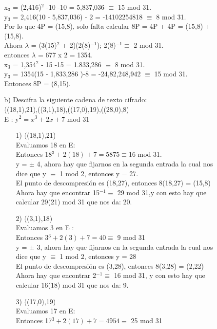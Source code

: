 \documentclass[11pt,letterpaper]{article}
\begin{document}
\begin{enumerate}
\begin{itemize}
x$_{3}$ = (2,416)$^{2}$ -10 -10 = 5,837,036 $\equiv$ 15 mod 31.\\
y$_{3}$ = 2,416(10 - 5,837,036) - 2 = -14102254818 $\equiv$ 8 mod 31.\\
Por lo que 4P = (15,8), solo falta calcular 8P = 4P + 4P = (15,8) + (15,8).\\
Ahora $\lambda$ = (3(15)$^{2}$ + 2)(2(8)$^{-1}$); 2(8)$^{-1} \equiv $ 2 mod 31. \\
entonces $\lambda$ = 677 x 2 = 1354.\\
x$_{3}$ = 1,354$^{2}$ - 15 -15 = 1.833,286 $\equiv$ 8 mod 31.\\
y$_{3}$ = 1354(15 - 1,833,286 )-8 = -24,82,248,942 $\equiv$ 15 mod 31.\\
Entonces 8P = (8,15).
\item[b)] Descifra la siguiente cadena de texto cifrado: \\
((18,1),21),((3,1),18),((17,0),19),((28,0),8)\\
E : y$^{2} = x^{3} + 2x + 7$ mod 31
\begin{itemize}
\item[1)] ((18,1),21)\\
Evaluamos 18 en E:\\
Entonces 18$^{3} +2(18) + 7 = 5875 \equiv $16 mod 31.\\
y = $\pm$ 4, ahora hay que fijarnos en la segunda entrada la cual nos dice que y $\equiv$ 1 mod 2, entonces y = 27.\\
El punto de descompresión es (18,27), entonces 8(18,27) = (15,8)\\
Ahora hay que encontrar 15$^{-1} \equiv $ 29 mod 31,y con esto hay que calcular 29(21) mod 31 que nos da: 20.
\item[2)] ((3,1),18)\\
Evaluamos 3 en E :\\
Entonces 3$^{3} + 2(3) + 7 = 40 \equiv $ 9 mod 31\\
y = $\pm$ 3, ahora hay que fijarnos en la segunda entrada la cual nos dice que y $\equiv$ 1 mod 2, entonces y = 28 \\ 
El punto de descompresión es (3,28), entonces 8(3,28) = (2,22)\\
Ahora hay que encontrar 2$^{-1} \equiv$ 16 mod 31, y con esto hay que calcular 16(18) mod 31 que nos da: 9.
\item[3)] ((17,0),19)\\
Evaluamos 17 en E:\\
Entonces 17$^{3} + 2(17) + 7 = 4954 \equiv$ 25 mod 31\\

\end{itemize}
\end{itemize}
\end{enumerate}
\end{document}
